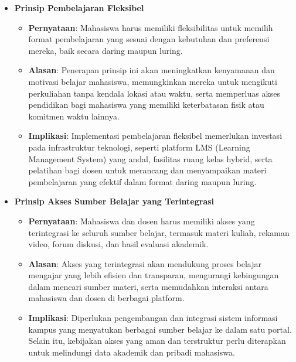 \begin{itemize}
	\item \textbf{Prinsip Pembelajaran Fleksibel}
	\begin{itemize}
		\item \textbf{Pernyataan}: Mahasiswa harus memiliki fleksibilitas untuk memilih format pembelajaran yang sesuai dengan kebutuhan dan preferensi mereka, baik secara daring maupun luring.
		\item \textbf{Alasan}: Penerapan prinsip ini akan meningkatkan kenyamanan dan motivasi belajar mahasiswa, memungkinkan mereka untuk mengikuti perkuliahan tanpa kendala lokasi atau waktu, serta memperluas akses pendidikan bagi mahasiswa yang memiliki keterbatasan fisik atau komitmen waktu lainnya.
		\item \textbf{Implikasi}: Implementasi pembelajaran fleksibel memerlukan investasi pada infrastruktur teknologi, seperti platform LMS (Learning Management System) yang andal, fasilitas ruang kelas hybrid, serta pelatihan bagi dosen untuk merancang dan menyampaikan materi pembelajaran yang efektif dalam format daring maupun luring.
	\end{itemize}
	
	\item \textbf{Prinsip Akses Sumber Belajar yang Terintegrasi}
	\begin{itemize}
		\item \textbf{Pernyataan}: Mahasiswa dan dosen harus memiliki akses yang terintegrasi ke seluruh sumber belajar, termasuk materi kuliah, rekaman video, forum diskusi, dan hasil evaluasi akademik.
		\item \textbf{Alasan}: Akses yang terintegrasi akan mendukung proses belajar mengajar yang lebih efisien dan transparan, mengurangi kebingungan dalam mencari sumber materi, serta memudahkan interaksi antara mahasiswa dan dosen di berbagai platform.
		\item \textbf{Implikasi}: Diperlukan pengembangan dan integrasi sistem informasi kampus yang menyatukan berbagai sumber belajar ke dalam satu portal. Selain itu, kebijakan akses yang aman dan terstruktur perlu diterapkan untuk melindungi data akademik dan pribadi mahasiswa.
	\end{itemize}
	

\end{itemize}
